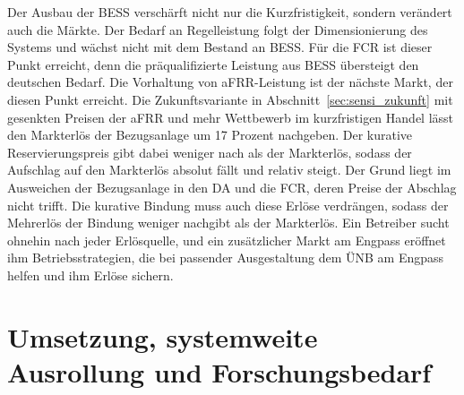 Der Ausbau der \ac{BESS} verschärft nicht nur die Kurzfristigkeit, sondern verändert auch die Märkte.
Der Bedarf an Regelleistung folgt der Dimensionierung des Systems und wächst nicht mit dem Bestand an \ac{BESS}.
Für die \ac{FCR} ist dieser Punkt erreicht, denn die präqualifizierte Leistung aus \ac{BESS} übersteigt den deutschen Bedarf.
Die Vorhaltung von \ac{aFRR}-Leistung ist der nächste Markt, der diesen Punkt erreicht.
Die Zukunftsvariante in Abschnitt~\ref{sec:sensi_zukunft} mit gesenkten Preisen der \ac{aFRR} und mehr Wettbewerb im kurzfristigen Handel lässt den Markterlös der Bezugsanlage um 17 Prozent nachgeben.
Der kurative Reservierungspreis gibt dabei weniger nach als der Markterlös, sodass der Aufschlag auf den Markterlös absolut fällt und relativ steigt.
Der Grund liegt im Ausweichen der Bezugsanlage in den \ac{DA} und die \ac{FCR}, deren Preise der Abschlag nicht trifft.
Die kurative Bindung muss auch diese Erlöse verdrängen, sodass der Mehrerlös der Bindung weniger nachgibt als der Markterlös.
Ein Betreiber sucht ohnehin nach jeder Erlösquelle, und ein zusätzlicher Markt am Engpass eröffnet ihm Betriebsstrategien, die bei passender Ausgestaltung dem \ac{ÜNB} am Engpass helfen und ihm Erlöse sichern.

\section{Umsetzung, systemweite Ausrollung und Forschungsbedarf}
\label{sec:implementation_outlook}

